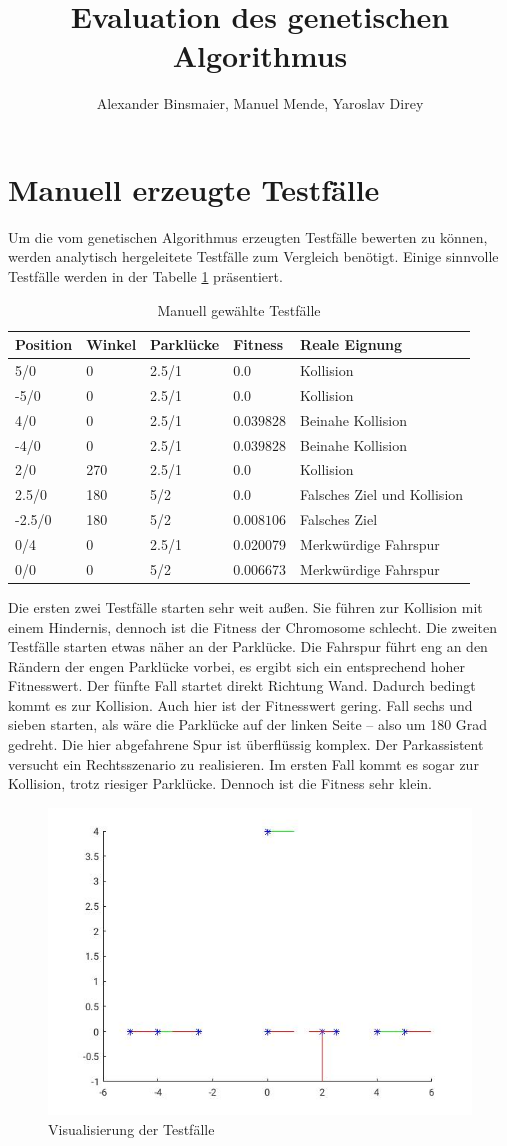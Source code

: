 \documentclass[12pt,a4paper]{article}
\author{Alexander Binsmaier, Manuel Mende, Yaroslav Direy}
\title{Evaluation des genetischen Algorithmus}
\begin{document}
\maketitle
\tableofcontents
\section{Manuell erzeugte Testfälle}
Um die vom genetischen Algorithmus erzeugten Testfälle bewerten zu können, werden analytisch hergeleitete Testfälle zum Vergleich benötigt. Einige sinnvolle Testfälle werden in der Tabelle \ref{tab:testfaelle} präsentiert.
\begin{table}\centering
\begin{tabular}{l|l|l|l|l}
Position & Winkel & Parklücke & Fitness & Reale Eignung \\\hline
5/0 & 0 & 2.5/1 & $0.0$ & Kollision \\
-5/0 & 0 & 2.5/1 & $0.0$ & Kollision \\
4/0 & 0 & 2.5/1 & $0.039828$ & Beinahe Kollision \\
-4/0 & 0 & 2.5/1 & $0.039828$ & Beinahe Kollision \\
2/0 & 270 & 2.5/1 & $0.0$ & Kollision \\
2.5/0 & 180 & 5/2 & $0.0$ & Falsches Ziel und Kollision \\
-2.5/0 & 180 & 5/2 & $0.008106$ & Falsches Ziel \\
0/4 &  0 & 2.5/1 & 0.020079 & Merkwürdige Fahrspur \\
0/0 &  0 & 5/2 & 0.006673 & Merkwürdige Fahrspur \\
\end{tabular}
\caption{Manuell gewählte Testfälle}
\label{tab:testfaelle}
\end{table}
Die ersten zwei Testfälle starten sehr weit außen. Sie führen zur Kollision mit einem Hindernis, dennoch ist die Fitness der Chromosome schlecht. Die zweiten Testfälle starten etwas näher an der Parklücke. Die Fahrspur führt eng an den Rändern der engen Parklücke vorbei, es ergibt sich ein entsprechend hoher Fitnesswert. Der fünfte Fall startet direkt Richtung Wand. Dadurch bedingt kommt es zur Kollision. Auch hier ist der Fitnesswert gering. Fall sechs und sieben starten, als wäre die Parklücke auf der linken Seite -- also um 180 Grad gedreht. Die hier abgefahrene Spur ist überflüssig komplex. Der Parkassistent versucht ein Rechtsszenario zu realisieren. Im ersten Fall kommt es sogar zur Kollision, trotz riesiger Parklücke. Dennoch ist die Fitness sehr klein.
\begin{figure}\centering
\includegraphics[width=.6\textwidth]{myTestcases.jpg}
\caption{Visualisierung der Testfälle}
\label{fig:testcases}
\end{figure}
\end{document}
